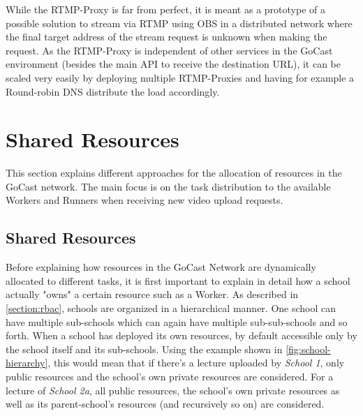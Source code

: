 While the RTMP-Proxy is far from perfect, it is meant as a prototype of a possible solution to stream via \ac{RTMP} using OBS in a distributed network where the final target address of the stream request is unknown when making the request. As the RTMP-Proxy is independent of other services in the GoCast environment (besides the main \ac{API} to receive the destination URL), it can be scaled very easily by deploying multiple RTMP-Proxies and having for example a Round-robin DNS distribute the load accordingly.

\section{Shared Resources}\label{section:shared-resources}

This section explains different approaches for the allocation of resources in the GoCast network. The main focus is on the task distribution to the available Workers and Runners when receiving new video upload requests.

\subsection{Shared Resources}

Before explaining how resources in the GoCast Network are dynamically allocated to different tasks, it is first important to explain in detail how a school actually "owns" a certain resource such as a Worker. As described in \autoref{section:rbac}, schools are organized in a hierarchical manner. One school can have multiple sub-schools which can again have multiple sub-sub-schools and so forth. When a school has deployed its own resources, by default accessible only by the school itself and its sub-schools. Using the example shown in \autoref{fig:school-hierarchy}, this would mean that if there's a lecture uploaded by \textit{School 1}, only public resources and the school's own private resources are considered. For a lecture of \textit{School 2a}, all public resources, the school's own private resources as well as its parent-school's resources (and recursively so on) are considered. 

